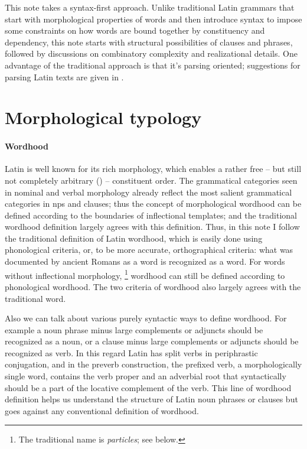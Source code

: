 \documentclass[a4paper, oneside, 12pt]{report}
\newcommand*{\term}[1]{\emph{#1}}
\begin{document}
This note takes a syntax-first approach.
Unlike traditional Latin grammars that start with morphological properties of words
and then introduce syntax to impose some constraints on how words are bound together
by constituency and dependency,
this note starts with structural possibilities of clauses and phrases,
followed by discussions on combinatory complexity and realizational details.
One advantage of the traditional approach is that it's parsing oriented;
suggestions for parsing Latin texts are given in .

\section{Morphological typology}\label{sec:grammatical.word}

\paragraph*{Wordhood}

Latin is well known for its rich morphology,
which enables a rather free -- but still not completely arbitrary ()
-- constituent order.
The grammatical categories seen in nominal and verbal morphology 
already reflect the most salient grammatical categories
in \acs{np}s and clauses;
thus the concept of morphological wordhood can be defined according to 
the boundaries of inflectional templates;
and the traditional wordhood definition largely agrees with this definition. 
Thus, in this note I follow the traditional definition of Latin wordhood,
which is easily done using phonological criteria,
or, to be more accurate, orthographical criteria: 
what was documented by ancient Romans as a word 
is recognized as a word.
For words without inflectional morphology,%
\footnote{
    The traditional name is \term{particles};
    see below.
} 
wordhood can still be defined according to phonological wordhood.
The two criteria of wordhood also largely agrees with the traditional word.

Also we can talk about various purely syntactic ways to define wordhood.
For example a noun phrase minus large complements or adjuncts should be recognized as a noun,
or a clause minus large complements or adjuncts should be recognized as verb.
In this regard Latin has split verbs in periphrastic conjugation,
and in the preverb construction, 
the prefixed verb, a morphologically single word, 
contains the verb proper and an adverbial root that 
syntactically should be a part of the locative complement of the verb. 
This line of wordhood definition helps us understand the structure of Latin noun phrases or clauses 
but goes against any conventional definition of wordhood.
\end{document}
